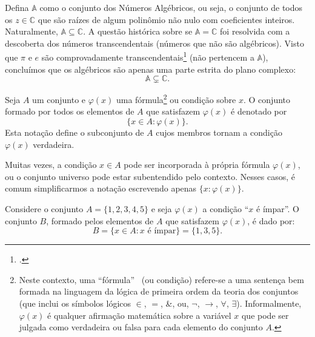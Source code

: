 \begin{exemplo}
    Defina \(\mathbb{A}\) como o conjunto dos Números Algébricos, ou seja, o conjunto de todos os \(z \in \mathbb{C}\) que são raízes de algum polinômio não nulo com coeficientes inteiros.
    Naturalmente, \(\mathbb{A} \subseteq \mathbb{C}\).
    A questão histórica sobre se \(\mathbb{A} = \mathbb{C}\) foi resolvida com a descoberta dos números transcendentais (números que não são algébricos).
    Visto que \(\pi\) e \(e\) são comprovadamente transcendentais\footcite{niven1939} (não pertencem a \(\mathbb{A}\)), concluímos que os algébricos são apenas uma parte estrita do plano complexo:
    \[
        \mathbb{A} \subsetneq \mathbb{C}.
    \]
\end{exemplo}

\begin{definicao}
    \label{def:notacao_construcao}
    Seja \(A\) um conjunto e \(\varphi (x)\) uma fórmula\footnote{Neste contexto, uma ``fórmula'' \ (ou condição) refere-se a uma sentença bem formada na linguagem da lógica de primeira ordem da teoria dos conjuntos (que inclui os símbolos lógicos \(\in\), \(=\), \&, ou, \(\neg\), \(\to\), \(\forall\), \(\exists\)). Informalmente, \(\varphi (x)\) é qualquer afirmação matemática sobre a variável \(x\) que pode ser julgada como verdadeira ou falsa para cada elemento do conjunto \(A\).} ou condição sobre \(x\). O conjunto formado por todos os elementos de \(A\) que satisfazem \(\varphi (x)\) é denotado por
    \[
        \{x \in A : \varphi (x)\}.
    \]
    Esta notação define o subconjunto de \(A\) cujos membros tornam a condição \(\varphi (x)\) verdadeira.
\end{definicao}

\begin{remark}
    Muitas vezes, a condição \(x \in A\) pode ser incorporada à própria fórmula \(\varphi(x)\), ou o conjunto universo pode estar subentendido pelo contexto. Nesses casos, é comum simplificarmos a notação escrevendo apenas \(\{x : \varphi(x)\}\).
\end{remark}

\begin{exemplo}
    Considere o conjunto \(A = \{1, 2, 3, 4, 5\}\) e seja \(\varphi(x)\) a condição ``\(x\) é ímpar''. O conjunto \(B\), formado pelos elementos de \(A\) que satisfazem \(\varphi(x)\), é dado por:
    \[
        B = \{x \in A : x \text{ é ímpar}\} = \{1, 3, 5\}.
    \]
\end{exemplo}

